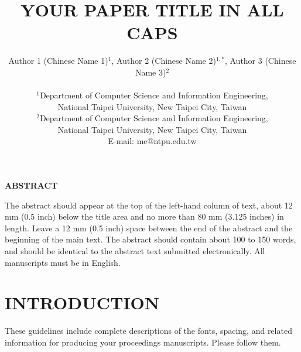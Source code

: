 \documentclass[10pt,twocolumn]{article}
\date{}
\begin{document}
\pagestyle{empty} %

\title{\textbf{YOUR PAPER TITLE IN ALL CAPS}}


\author{
    Author 1 (Chinese Name 1)$^{1}$,
    Author 2 (Chinese Name 2)$^{1,*}$,
    Author 3 (Chinese Name 3)$^{2}$\\
    \\
    $^{1}$Department of Computer Science and Information Engineering,\\
    National Taipei University, New Taipei City, Taiwan\\
    $^{2}$Department of Computer Science and Information Engineering,\\
    National Taipei University, New Taipei City, Taiwan\\
    E-mail: me@ntpu.edu.tw
}



\maketitle

\thispagestyle{empty}  %


\begin{center}
\textbf{ABSTRACT}
\end{center}

\noindent
The abstract should appear at the top of the left-hand column of text, about 12 mm (0.5 inch) below the title area and no more than 80 mm (3.125 inches) in length. Leave a 12 mm (0.5 inch) space between the end of the abstract and the beginning of the main text. The abstract should contain about 100 to 150 words, and should be identical to the abstract text submitted electronically. All manuscripts must be in English.

\noindent
\begin{flushleft}
\end{flushleft}



\section{INTRODUCTION}
These guidelines include complete descriptions of the fonts, spacing, and related information for producing your proceedings manuscripts. Please follow them.
\end{document}
